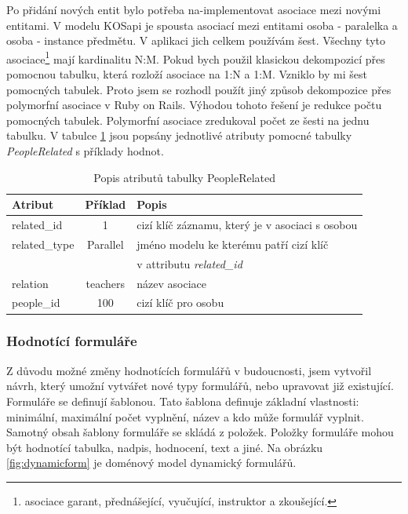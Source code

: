 Po přidání nových entit bylo potřeba na-implementovat asociace mezi novými entitami. V modelu KOSapi je spousta asociací mezi entitami osoba - paralelka a osoba - instance předmětu. V aplikaci jich celkem používám šest. Všechny tyto asociace\footnote{asociace garant, přednášející, vyučující, instruktor a zkoušející.} mají kardinalitu N:M. Pokud bych použil klasickou dekompozicí přes pomocnou tabulku, která rozloží asociace na 1:N a 1:M. Vzniklo by mi šest pomocných tabulek. Proto jsem se rozhodl použít jiný způsob dekompozice přes polymorfní asociace \cite{guide_pa} v Ruby on Rails. Výhodou tohoto řešení je redukce počtu pomocných tabulek. Polymorfní asociace zredukoval počet ze šesti na jednu tabulku. V tabulce \ref{tab:people_related} jsou popsány jednotlivé atributy pomocné tabulky \textit{PeopleRelated} s příklady hodnot.

\begin{table}[h]
\begin{center}
\begin{tabular}{|l|c|l|}

\hline
\textbf{Atribut} & \textbf{Příklad} & \textbf{Popis} \\ \hline
related\_id & 1 & cizí klíč záznamu, který je v asociaci s osobou \\\hline
related\_type & Parallel & jméno modelu ke kterému patří cizí klíč \\ & & v attributu \textit{related\_id} \\ \hline
relation & teachers & název asociace \\\hline
people\_id & 100 & cizí klíč pro osobu  \\\hline

\end{tabular}
\caption{Popis atributů tabulky PeopleRelated}
\label{tab:people_related}
\end{center}
\end{table}


\subsubsection{Hodnotící formuláře}
Z důvodu možné změny hodnotících formulářů v budoucnosti, jsem vytvořil návrh, který umožní vytvářet nové typy formulářů, nebo upravovat již existující. Formuláře se definují šablonou. Tato šablona definuje základní vlastnosti: minimální, maximální počet vyplnění, název a kdo může formulář vyplnit. Samotný obsah šablony formuláře se skládá z položek. Položky formuláře mohou být hodnotící tabulka, nadpis, hodnocení, text a jiné. Na obrázku \ref{fig:dynamicform} je doménový model dynamický formulářů.

